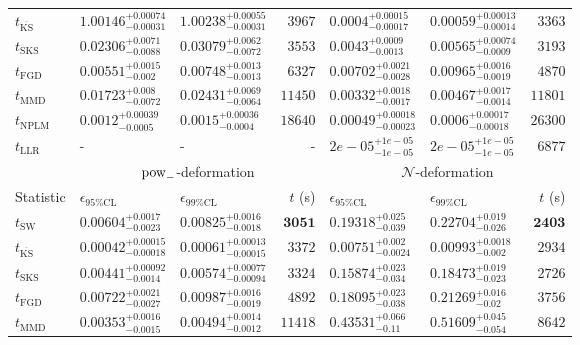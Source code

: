 \begin{tabular}{l|llr|llr}
	$t_{\overline{\mathrm{KS}}}$ & $1.00146_{-0.00031}^{+0.00074}$ & $1.00238_{-0.00031}^{+0.00055}$ & $3967$ & ${\mathbf{0.0004_{-0.00017}^{+0.00015}}}$ & ${\mathbf{0.00059_{-0.00014}^{+0.00013}}}$ & $3363$ \\
	$t_{\mathrm{SKS}}$ & $0.02306_{-0.0088}^{+0.0071}$ & $0.03079_{-0.0072}^{+0.0062}$ & $3553$ & $0.0043_{-0.0013}^{+0.0009}$ & $0.00565_{-0.0009}^{+0.00074}$ & $3193$ \\
	$t_{\mathrm{FGD}}$ & ${\mathbf{0.00551_{-0.002}^{+0.0015}}}$ & ${\mathbf{0.00748_{-0.0013}^{+0.0013}}}$ & $6327$ & $0.00702_{-0.0028}^{+0.0021}$ & $0.00965_{-0.0019}^{+0.0016}$ & $4870$ \\
	$t_{\mathrm{MMD}}$ & $0.01723_{-0.0072}^{+0.008}$ & $0.02431_{-0.0064}^{+0.0069}$ & $11450$ & $0.00332_{-0.0017}^{+0.0018}$ & $0.00467_{-0.0014}^{+0.0017}$ & $11801$ \\
\rowcolor{red!35}	$t_{\mathrm{NPLM}}$ & $0.0012_{-0.0005}^{+0.00039}$ & $0.0015_{-0.0004}^{+0.00036}$ & $18640$ & $0.00049_{-0.00023}^{+0.00018}$ & $0.0006_{-0.00018}^{+0.00017}$ & $26300$ \\
	$t_{\mathrm{LLR}}$ & - & - & - & $2e-05_{-1e-05}^{+1e-05}$ & $2e-05_{-1e-05}^{+1e-05}$ & $6877$ \\
	\toprule
	\multicolumn{1}{c}{} & \multicolumn{3}{c}{$\rm{pow}_{-}$-deformation} & \multicolumn{3}{c}{$\mathcal{N}$-deformation} \\
	Statistic & $\epsilon_{95\%\mathrm{CL}}$ & $\epsilon_{99\%\mathrm{CL}}$ & $t$ (s) & $\epsilon_{95\%\mathrm{CL}}$ & $\epsilon_{99\%\mathrm{CL}}$ & $t$ (s) \\
	\midrule
	$t_{\mathrm{SW}}$ & $0.00604_{-0.0023}^{+0.0017}$ & $0.00825_{-0.0018}^{+0.0016}$ & ${\mathbf{3051}}$ & $0.19318_{-0.039}^{+0.025}$ & $0.22704_{-0.026}^{+0.019}$ & ${\mathbf{2403}}$ \\
	$t_{\overline{\mathrm{KS}}}$ & ${\mathbf{0.00042_{-0.00018}^{+0.00015}}}$ & ${\mathbf{0.00061_{-0.00015}^{+0.00013}}}$ & $3372$ & ${\mathbf{0.00751_{-0.0024}^{+0.002}}}$ & ${\mathbf{0.00993_{-0.002}^{+0.0018}}}$ & $2934$ \\
	$t_{\mathrm{SKS}}$ & $0.00441_{-0.0014}^{+0.00092}$ & $0.00574_{-0.00094}^{+0.00077}$ & $3324$ & $0.15874_{-0.034}^{+0.023}$ & $0.18473_{-0.023}^{+0.019}$ & $2726$ \\
	$t_{\mathrm{FGD}}$ & $0.00722_{-0.0027}^{+0.0021}$ & $0.00987_{-0.0019}^{+0.0016}$ & $4892$ & $0.18095_{-0.038}^{+0.023}$ & $0.21269_{-0.02}^{+0.016}$ & $3756$ \\
	$t_{\mathrm{MMD}}$ & $0.00353_{-0.0015}^{+0.0016}$ & $0.00494_{-0.0012}^{+0.0014}$ & $11418$ & $0.43531_{-0.11}^{+0.066}$ & $0.51609_{-0.054}^{+0.045}$ & $8642$ \\

\end{tabular}
